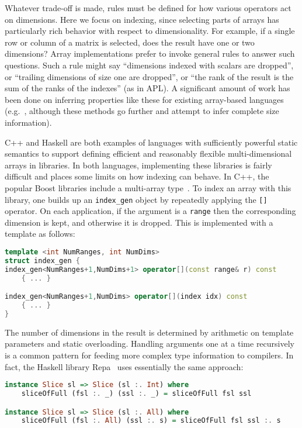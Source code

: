 Whatever trade-off is made, rules must be defined for how various operators
act on dimensions.
Here we focus on indexing, since selecting parts of arrays has particularly
rich behavior with respect to dimensionality.
For example, if a single row or column of a matrix is
selected, does the result have one or two dimensions?
Array implementations prefer to invoke general rules to answer such questions.
Such a rule might say ``dimensions indexed with scalars are dropped'', or ``trailing
dimensions of size one are dropped'', or ``the rank of the result
is the sum of the ranks of the indexes'' (as in APL).
A significant amount of work has been done on inferring properties like these
for existing array-based languages
(e.g.\ \cite{Joisha:2006:AAS:1152649.1152651,Garg:2014:JSI:2627373.2627382},
although these methods go further and attempt to infer complete size
information).

C++ and Haskell are both examples of languages with sufficiently powerful
static semantics to support defining efficient and reasonably flexible
multi-dimensional arrays in libraries.
In both languages, implementing these libraries is fairly difficult and
places some limits on how indexing can behave.
In C++, the popular Boost libraries include a multi-array
type~\cite{garcia2005multiarray}.
To index an array with this library, one builds up an \texttt{index\_gen}
object by repeatedly applying the \texttt{[]} operator.
On each application, if the argument is a \texttt{range} then the
corresponding dimension is kept, and otherwise it is dropped.
This is implemented with a template as follows:

\begin{singlespace}
\begin{lstlisting}[language=c++,style=ttcode]
template <int NumRanges, int NumDims>
struct index_gen {
index_gen<NumRanges+1,NumDims+1> operator[](const range& r) const
    { ... }

index_gen<NumRanges+1,NumDims> operator[](index idx) const
    { ... }
}
\end{lstlisting}
\end{singlespace}

\noindent
The number of dimensions in the result is determined by arithmetic
on template parameters and static overloading.
Handling arguments one at a time recursively is a common pattern
for feeding more complex type information to compilers.
In fact, the Haskell library Repa~\cite{Keller:2010rs} uses
essentially the same approach:

\begin{singlespace}
\begin{lstlisting}[language=haskell,style=ttcode]
instance Slice sl => Slice (sl :. Int) where
    sliceOfFull (fsl :. _) (ssl :. _) = sliceOfFull fsl ssl

instance Slice sl => Slice (sl :. All) where
    sliceOfFull (fsl :. All) (ssl :. s) = sliceOfFull fsl ssl :. s
\end{lstlisting}
\end{singlespace}

